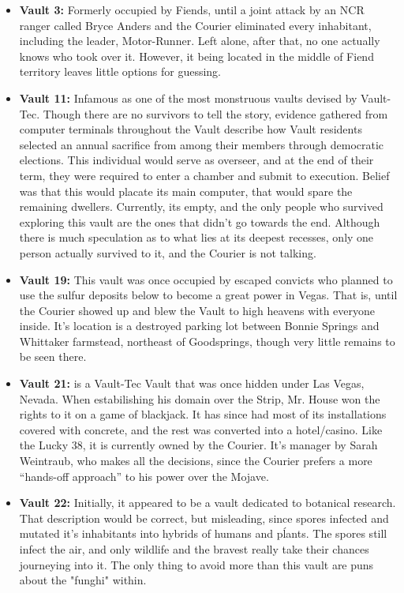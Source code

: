 \documentclass[11pt]{article} %
\begin{document}
\begin{itemize}
	\item \textbf{Vault 3:} Formerly occupied by Fiends, until a joint attack by an NCR ranger called Bryce Anders and the Courier eliminated every inhabitant, including the leader, Motor-Runner. Left alone, after that, no one actually knows who took over it. However, it being located in the middle of Fiend territory leaves little options for guessing.
	
	\item \textbf{Vault 11:} Infamous as one of the most monstruous vaults devised by Vault-Tec. Though there are no survivors to tell the story, evidence gathered from computer terminals throughout the Vault describe how Vault residents selected an annual sacrifice from among their members through democratic elections. This individual would serve as overseer, and at the end of their term, they were required to enter a chamber and submit to execution. Belief was that this would placate its main computer, that would spare the remaining dwellers. Currently, its empty, and the only people who survived exploring this vault are the ones that didn't go towards the end. Although there is much speculation as to what lies at its deepest recesses, only one person actually survived to it, and the Courier is not talking.
	
	\item \textbf{Vault 19:} This vault was once occupied by escaped convicts who planned to use the sulfur deposits below to become a great power in Vegas. That is, until the Courier showed up and blew the Vault to high heavens with everyone inside. It's location is a destroyed parking lot between Bonnie Springs and Whittaker farmstead, northeast of Goodsprings, though very little remains to be seen there.
	
	\item \textbf{Vault 21:} is a Vault-Tec Vault that was once hidden under Las Vegas, Nevada. When estabilishing his domain over the Strip, Mr. House won the rights to it on a game of blackjack. It has since had most of its installations covered with concrete, and the rest was converted into a hotel/casino. Like the Lucky 38, it is currently owned by the Courier. It's manager by Sarah Weintraub, who makes all the decisions, since the Courier prefers a more ``hands-off approach'' to his power over the Mojave.
	
	\item \textbf{Vault 22:} Initially, it appeared to be a vault dedicated to botanical research. That description would be correct, but misleading, since spores infected and mutated it's inhabitants into hybrids of humans and pĺants. The spores still infect the air, and only wildlife and the bravest really take their chances journeying into it. The only thing to avoid more than this vault are puns about the "funghi" within.
	

\end{itemize}
\end{document}
